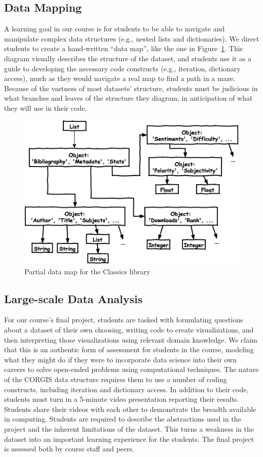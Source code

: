 \documentclass{sig-alternate}
\begin{document}
\subsection{Data Mapping}

A learning goal in our course is for students to be able to navigate and manipulate complex data structures (e.g., nested lists and dictionaries).
We direct students to create a hand-written ``data map'', like the one in Figure~\ref{fig:classics-data-map}.
This diagram visually describes the structure of the dataset, and students use it as a guide to developing the necessary code constructs (e.g., iteration, dictionary access), much as they would navigate a real map to find a path in a maze.
Because of the vastness of most datasets' structure, students must be judicious in what branches and leaves of the structure they diagram, in anticipation of what they will use in their code.

\begin{figure}[ht!]
    \centering
    \includegraphics[width=.47\textwidth]{graphics/classics-data-map}
    \caption{Partial data map for the Classics library}
    \label{fig:classics-data-map}
\end{figure}


\subsection{Large-scale Data Analysis}

For our course's final project, students are tasked with formulating questions about a  dataset of their own choosing, writing code to create visualizations, and then interpreting those visualizations using relevant domain knowledge.
We claim that this is an authentic form of assessment for students in the course, modeling what they might do if they were to incorporate data science into their own careers to solve open-ended problems using computational techniques.
The nature of the CORGIS data structure requires them to use a number of coding constructs, including iteration and dictionary access.
In addition to their code, students must turn in a 5-minute video presentation reporting their results.
Students share their videos with each other to demonstrate the breadth available in computing.
Students are required to describe the abstractions used in the project and the inherent limitations of the dataset.
This turns a weakness in the dataset into an important learning experience for the students.
The final project is assessed both by course staff and peers.
\end{document}
